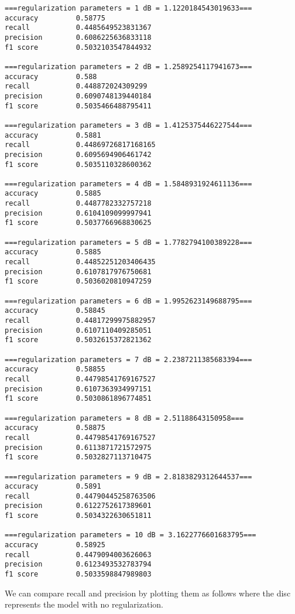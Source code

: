\begin{Verbatim}[commandchars=\\\{\}]
===regularization parameters = 1 dB = 1.1220184543019633===
accuracy         0.58775
recall           0.4485649523831367
precision        0.6086225636833118
f1 score         0.5032103547844932

===regularization parameters = 2 dB = 1.2589254117941673===
accuracy         0.588
recall           0.448872024309299
precision        0.6090748139440184
f1 score         0.5035466488795411

===regularization parameters = 3 dB = 1.4125375446227544===
accuracy         0.5881
recall           0.44869726817168165
precision        0.6095694906461742
f1 score         0.5035110328600362

===regularization parameters = 4 dB = 1.5848931924611136===
accuracy         0.5885
recall           0.4487782332757218
precision        0.6104109099997941
f1 score         0.5037766968830625

===regularization parameters = 5 dB = 1.7782794100389228===
accuracy         0.5885
recall           0.44852251203406435
precision        0.6107817976750681
f1 score         0.5036020810947259

===regularization parameters = 6 dB = 1.9952623149688795===
accuracy         0.58845
recall           0.44817299975882957
precision        0.6107110409285051
f1 score         0.5032615372821362

===regularization parameters = 7 dB = 2.2387211385683394===
accuracy         0.58855
recall           0.44798541769167527
precision        0.6107363934997151
f1 score         0.5030861896774851

===regularization parameters = 8 dB = 2.51188643150958===
accuracy         0.58875
recall           0.44798541769167527
precision        0.6113871721572975
f1 score         0.5032827113710475

===regularization parameters = 9 dB = 2.8183829312644537===
accuracy         0.5891
recall           0.44790445258763506
precision        0.6122752617389601
f1 score         0.5034322630651811

===regularization parameters = 10 dB = 3.1622776601683795===
accuracy         0.58925
recall           0.4479094003626063
precision        0.6123493532783794
f1 score         0.5033598847989803

    \end{Verbatim}

    We can compare recall and precision by plotting them as follows where
the disc represents the model with no regularization.

